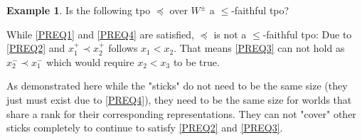 \documentclass[english, 12pt]{scrartcl}
\theoremstyle{definition}
\newtheorem{example}{Example}[section]
\theoremstyle{definition}
\theoremstyle{definition}
\begin{document}
\newpage

\begin{example}
    \label{example:example-faithful-tpo}
    Is the following tpo $\preceq$ over $W^{\pm}$ a $\leq$-faithful tpo?
        
    \begin{figure}[h]
        \centering
    \end{figure}
    
    While \ref{PREQ1} and \ref{PREQ4} are satisfied, $\preceq$ is not a $\leq$-faithful tpo: Due to \ref{PREQ2} and $x_{1}^{+} \prec x_{2}^{+}$ follows $x_{1} < x_{2}$. That means \ref{PREQ3} can not hold as $x_{2}^{-} \prec x_{1}^{-}$ which would require $x_{2} < x_{3}$ to be true.
    
    As demonstrated here while the "sticks" do not need to be the same size (they just must exist due to \ref{PREQ4}), they need to be the same size for worlds that share a rank for their corresponding representations. They can not "cover" other sticks completely to continue to satisfy \ref{PREQ2} and \ref{PREQ3}.
\end{example}
\end{document}
